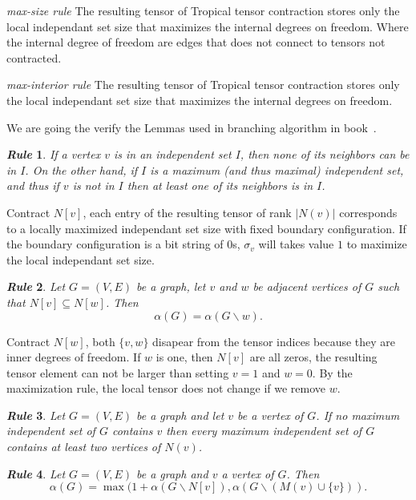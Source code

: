 \documentclass{article}
\newcommand{\<}{\langle}
\renewcommand{\>}{\rangle}
\renewcommand{\cite}[1]{{\citep{#1}}}
\newtheorem{theorem}{\textit{Rule}}
\theoremstyle{definition}\newtheorem{definition}{\textit{Definition}}
\begin{document}
\textit{max-size rule} The resulting tensor of Tropical tensor contraction stores only the local independant set size that maximizes the internal degrees on freedom.
Where the internal degree of freedom are edges that does not connect to tensors not contracted.

\textit{max-interior rule} The resulting tensor of Tropical tensor contraction stores only the local independant set size that maximizes the internal degrees on freedom.

We are going the verify the Lemmas used in branching algorithm in book~\cite{Fomin2013}.
\begin{theorem}\label{rule:one} %
  If a vertex $v$ is in an independent set $I$, then none of its neighbors can be in $I$.
On the other hand, if $I$ is a maximum (and thus maximal) independent set,
and thus if $v$ is not in $I$ then at least one of its neighbors is in $I$.
\end{theorem}

Contract $N[v]$, each entry of the resulting tensor of rank $|N(v)|$ corresponds to a locally maximized independant set size with fixed boundary configuration.
If the boundary configuration is a bit string of 0s, $\sigma_v$ will takes value $1$ to maximize the local independant set size.

\begin{theorem} %
Let $G=(V,E)$ be a graph, let $v$ and $w$ be adjacent vertices of $G$ such that $N[v] \subseteq N[w]$. Then
\begin{equation}
\alpha(G)=\alpha(G\backslash w).
\end{equation}
\end{theorem}

Contract $N[w]$, both $\{v, w\}$ disapear from the tensor indices because they are inner degrees of freedom.
If $w$ is one, then $N[v]$ are all zeros, the resulting tensor element can not be larger than setting $v=1$ and $w=0$.
By the maximization rule, the local tensor does not change if we remove $w$.

\begin{theorem} %
  Let $G = (V, E)$ be a graph and let $v$ be a vertex of $G$. If no maximum
independent set of $G$ contains $v$ then every maximum independent set of $G$ contains
at least two vertices of $N(v)$.
\end{theorem}

\begin{theorem} %
Let $G = (V, E)$ be a graph and $v$ a vertex of $G$. Then
\begin{equation}
\alpha(G) = \max(1 + \alpha(G \backslash N[v]), \alpha(G \backslash (M(v) \cup \{v\})).
\end{equation}
\end{theorem}
\end{document}
